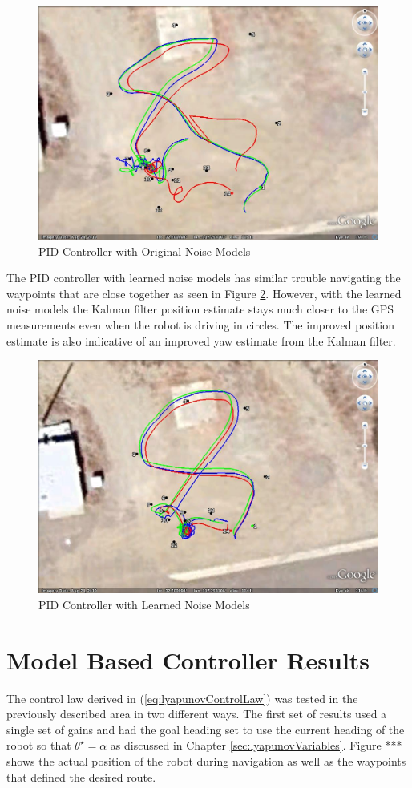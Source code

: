 \begin{figure}[ht!]
	\centering
	\includegraphics[width=.75\textwidth]{images/GE/20101203_1755_kf_pidOrigQR}
	\caption{PID Controller with Original Noise Models}
	\label{fig:kfResults3}
\end{figure}

The PID controller with learned noise models has similar trouble navigating the waypoints that are close together as seen in Figure \ref{fig:kfResults4}. However, with the learned noise models the Kalman filter position estimate stays much closer to the GPS measurements even when the robot is driving in circles. The improved position estimate is also indicative of an improved yaw estimate from the Kalman filter.

\begin{figure}[ht!]
	\centering
	\includegraphics[width=.75\textwidth]{images/GE/20101203_1751_kf_pidNewQR}
	\caption{PID Controller with Learned Noise Models}
	\label{fig:kfResults4}
\end{figure}

\section{Model Based Controller Results}
\label{sec:lyapunovResults}
The control law derived in (\ref{eq:lyapunovControlLaw}) was tested in the previously described area in two different ways. The first set of results used a single set of gains and had the goal heading set to use the current heading of the robot so that $\theta^\star=\alpha$ as discussed in Chapter \ref{sec:lyapunovVariables}. Figure *** shows the actual position of the robot during navigation as well as the waypoints that defined the desired route.

